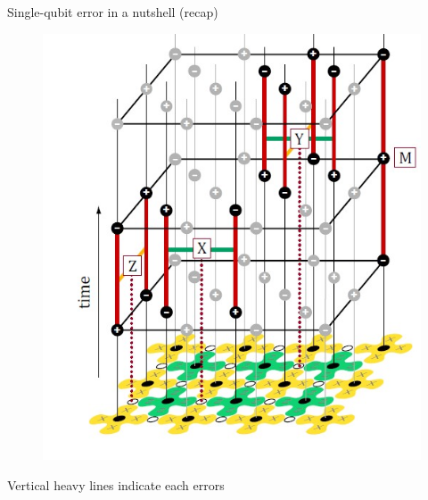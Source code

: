 \documentclass{beamer}
\begin{document}
    \begin{frame}{Single-qubit error in a nutshell (recap)}
        \begin{figure}[h]
            \centering
            \includegraphics[height=0.7\textheight]{./Images/surf-code-single-error.jpg}
        \end{figure}
        Vertical heavy lines indicate each errors
    \end{frame}
\end{document}
